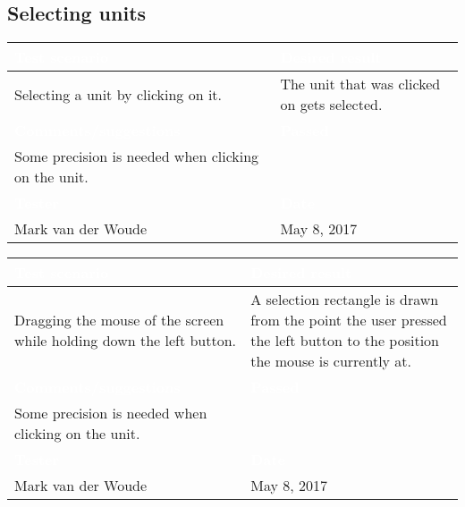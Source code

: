 \subsection{Selecting units}

\begin{tabularx}{\textwidth}{|X|X|}
\hline
\rowcolor{lightgray}\textcolor{white}{\textbf{Test scenario}} &
\textcolor{white}{\textbf{Desired result}}       
\\\hline
Selecting a unit by clicking on it. & The unit that was clicked on gets selected.       
\\\hline
\rowcolor{lightgray}\textcolor{white}{\textbf{Comments/suggestions}} & 
\textcolor{white}{\textbf{Passed}}
\\\hline
Some precision is needed when clicking on the unit. & \cellcolor{green}                      
\\\hline
\rowcolor{lightgray}\textcolor{white}{\textbf{Tester}} & \cellcolor{lightgray}\textcolor{white}{\textbf{Date}}               
\\\hline
Mark van der Woude & May 8, 2017                               		 
\\\hline
\end{tabularx}

\begin{tabularx}{\textwidth}{|X|X|}
\hline
\rowcolor{lightgray}\textcolor{white}{\textbf{Test scenario}} &
\textcolor{white}{\textbf{Desired result}}       
\\\hline
Dragging the mouse of the screen while holding down the left button. & A selection rectangle is drawn from the point the user pressed the left button to the position the mouse is currently at.       
\\\hline
\rowcolor{lightgray}\textcolor{white}{\textbf{Comments/suggestions}} & 
\textcolor{white}{\textbf{Passed}}
\\\hline
Some precision is needed when clicking on the unit. & \cellcolor{green}                      
\\\hline
\rowcolor{lightgray}\textcolor{white}{\textbf{Tester}} & \cellcolor{lightgray}\textcolor{white}{\textbf{Date}}               
\\\hline
Mark van der Woude & May 8, 2017                               		 
\\\hline
\end{tabularx}

